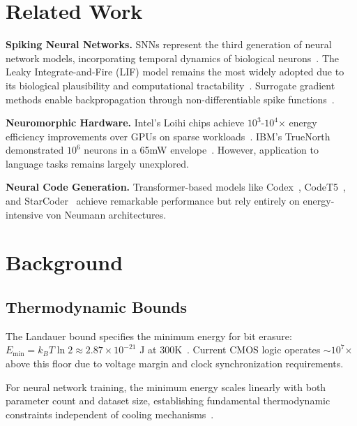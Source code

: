 \documentclass[11pt,a4paper]{article}
\begin{document}
\section{Related Work}

\textbf{Spiking Neural Networks.} SNNs represent the third generation of neural network models, incorporating temporal dynamics of biological neurons~\citep{maass1997networks}. The Leaky Integrate-and-Fire (LIF) model remains the most widely adopted due to its biological plausibility and computational tractability~\citep{gerstner2002spiking}. Surrogate gradient methods enable backpropagation through non-differentiable spike functions~\citep{neftci2019surrogate}.

\textbf{Neuromorphic Hardware.} Intel's Loihi chips achieve $10^3$-$10^4$× energy efficiency improvements over GPUs on sparse workloads~\citep{davies2018loihi}. IBM's TrueNorth demonstrated $10^6$ neurons in a 65mW envelope~\citep{merolla2014million}. However, application to language tasks remains largely unexplored.

\textbf{Neural Code Generation.} Transformer-based models like Codex~\citep{chen2021evaluating}, CodeT5~\citep{wang2021codet5}, and StarCoder~\citep{li2023starcoder} achieve remarkable performance but rely entirely on energy-intensive von Neumann architectures.

\section{Background}

\subsection{Thermodynamic Bounds}

The Landauer bound specifies the minimum energy for bit erasure: $E_{\min} = k_B T \ln 2 \approx 2.87 \times 10^{-21}$ J at 300K~\citep{landauer1961irreversibility}. Current CMOS logic operates $\sim 10^7$× above this floor due to voltage margin and clock synchronization requirements.

For neural network training, the minimum energy scales linearly with both parameter count and dataset size, establishing fundamental thermodynamic constraints independent of cooling mechanisms~\citep{frank2023thermodynamics}.
\end{document}
